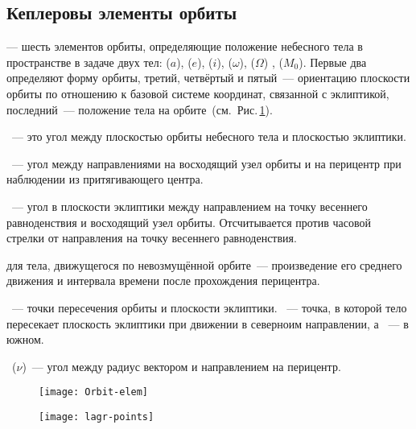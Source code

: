 \subsection{Кеплеровы элементы орбиты}

 --- шесть элементов орбиты, определяющие положение небесного тела в пространстве в задаче двух тел:  ($a$),  ($e$),  ($i$),  ($\omega$),  ($\Omega$) ,  ($M_0$). Первые два определяют форму орбиты, третий, четвёртый и пятый~--- ориентацию плоскости орбиты по отношению к базовой системе координат, связанной с эклиптикой, последний~--- положение тела на орбите~(см.~Рис.\,\ref{fig:orb-elem}).

~--- это угол между плоскостью орбиты небесного тела и плоскостью эклиптики.

~--- угол между направлениями на восходящий узел орбиты и на перицентр при наблюдении из притягивающего центра.

~--- угол в плоскости эклиптики между направлением на точку весеннего равноденствия и восходящий узел орбиты. Отсчитывается против часовой стрелки от направления на точку весеннего равноденствия.

 для тела, движущегося по невозмущённой орбите~--- произведение его среднего движения и интервала времени после прохождения перицентра.

~--- точки пересечения орбиты и плоскости эклиптики. ~--- точка, в которой тело пересекает плоскость эклиптики при движении в северноим направлении, а ~--- в южном.

~($\nu$)~--- угол между радиус вектором и направлением на перицентр. 

\begin{figure}[h!]
\begin{minipage}[b]{0.49\tw}
	\centering
	\texttt{[image: Orbit-elem]}
	\label{fig:orb-elem}
\end{minipage}
\hfill
\begin{minipage}[b]{0.49\tw}
	\centering
	\texttt{[image: lagr-points]}
\end{minipage}
\end{figure}